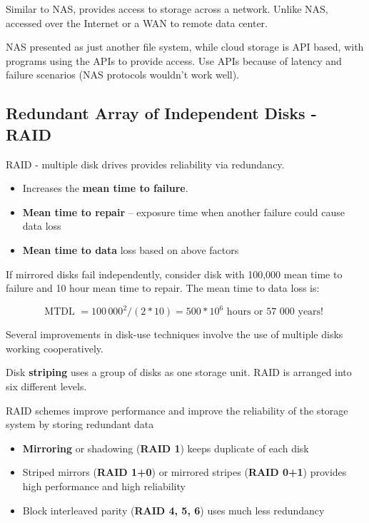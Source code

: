 Similar to NAS, provides access to storage across a network. Unlike NAS, accessed over the Internet or a WAN to remote
data center.

NAS presented as just another file system, while cloud storage is
API based, with programs using the APIs to provide access. Use APIs because of latency and failure scenarios (NAS
protocols wouldn’t work well).

\subsection{Redundant Array of Independent Disks - RAID}

RAID - multiple disk drives provides reliability via redundancy. 

\begin{itemize}
    \item Increases the \textbf{mean time to failure}.
    \item \textbf{Mean time to repair} – exposure time when another failure could cause data loss
    \item \textbf{Mean time to data} loss based on above factors
\end{itemize}


If mirrored disks fail independently, consider disk with 100,000 mean
time to failure and 10 hour mean time to repair. The mean time to data loss is:

\begin{equation*}
    \text{MTDL } = 100\,000^2 / (2*10) = 500 * 10^6 \text{ hours or 57 000 years! }   
\end{equation*}

Several improvements in disk-use techniques involve the use of
multiple disks working cooperatively.

\newpage

Disk \textbf{striping} uses a group of disks as one storage unit. RAID is arranged into six different levels.

RAID schemes improve performance and improve the reliability of
the storage system by storing redundant data


\begin{itemize}
    \item \textbf{Mirroring} or shadowing (\textbf{RAID 1}) keeps duplicate of each disk
    \item Striped mirrors (\textbf{RAID 1+0}) or mirrored stripes (\textbf{RAID 0+1}) provides high performance and high reliability
    \item Block interleaved parity (\textbf{RAID 4, 5, 6}) uses much less redundancy
\end{itemize}

